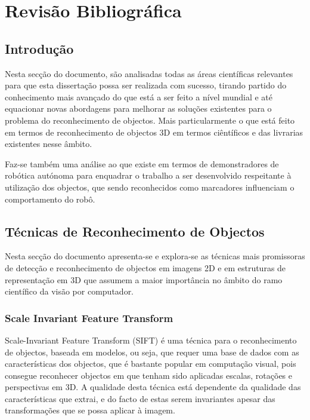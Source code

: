 \chapter{Revisão Bibliográfica} \label{chap:sota}

\section{Introdução}
Nesta secção do documento, são analisadas todas as áreas científicas relevantes
para que esta dissertação possa ser realizada com sucesso, tirando partido do
conhecimento mais avançado do que está a ser feito a nível mundial e até 
equacionar novas abordagens para melhorar as soluções existentes para o problema
do reconhecimento de objectos. Mais particularmente o que está feito em termos de
reconhecimento de objectos 3D em termos ciêntíficos e das livrarias existentes
nesse âmbito.

Faz-se também uma análise ao que existe em termos de demonstradores de robótica autónoma
para enquadrar o trabalho a ser desenvolvido respeitante à utilização dos objectos,
que sendo reconhecidos como marcadores influenciam o comportamento do robô.

\section{Técnicas de Reconhecimento de Objectos}\label{objdetect}

Nesta secção do documento apresenta-se e explora-se as técnicas mais
promissoras de detecção e reconhecimento de objectos em imagens 2D e
em estruturas de representação em 3D que assumem a maior importância 
no âmbito do ramo científico da visão por computador.

\subsection[SIFT]{Scale Invariant Feature Transform}

Scale-Invariant Feature Transform (SIFT) \cite{Lowe:1999:ORL:850924.851523} é uma técnica
para o reconhecimento de objectos, baseada em modelos, ou seja, que requer
uma base de dados com as características dos objectos, que é bastante 
popular em computação visual, pois consegue reconhecer objectos em 
que tenham sido aplicadas escalas, rotações e perspectivas em 3D. A qualidade
desta técnica está dependente da qualidade das características que extrai,
e do facto de estas serem invariantes apesar das transformações que se possa aplicar à imagem.

